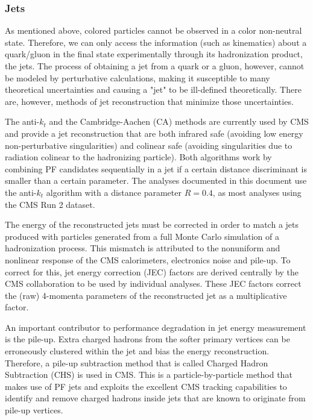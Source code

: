 \subsubsection{Jets}

As mentioned above, colored particles cannot be observed in a color non-neutral state. 
Therefore, we can only access the information (such as kinematics) about a quark/gluon in the final state experimentally through its hadronization product, the jets. 
The process of obtaining a jet from a quark or a gluon, however, cannot be modeled by perturbative calculations, making it susceptible to many theoretical uncertainties and causing a "jet" to be ill-defined theoretically. 
There are, however, methods of jet reconstruction that minimize those uncertainties. 

The anti-$k_t$ and the Cambridge-Aachen (CA) methods are currently used by CMS and provide a jet reconstruction that are both infrared safe (avoiding low energy non-perturbative singularities) and colinear safe (avoiding singularities due to radiation colinear to the hadronizing particle). 
Both algorithms work by combining PF candidates sequentially in a jet if a certain distance discriminant is smaller than a certain parameter. 
The analyses documented in this document use the anti-$k_t$ algorithm with a distance parameter $R=0.4$, as most analyses using the CMS Run 2 dataset.

The energy of the reconstructed jets must be corrected in order to match a jets produced with particles generated from a full Monte Carlo simulation of a hadronization process. 
This mismatch is attributed to the nonuniform and nonlinear response of the CMS calorimeters, electronics noise and pile-up. 
To correct for this, jet energy correction (JEC) factors are derived centrally by the CMS collaboration to be used by individual analyses. 
These JEC factors correct the (raw) 4-momenta parameters of the reconstructed jet as a multiplicative factor.

An important contributor to performance degradation in jet energy measurement is the pile-up. 
Extra charged hadrons from the softer primary vertices can be erroneously clustered within the jet and bias the energy reconstruction. 
Therefore, a pile-up subtraction method that is called Charged Hadron Subtraction (CHS) is used in CMS. 
This is a particle-by-particle method that makes use of PF jets and exploits the excellent CMS tracking capabilities to identify and remove charged hadrons inside jets that are known to originate from pile-up vertices.

